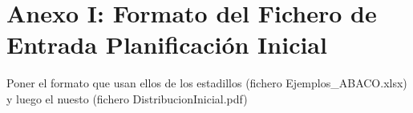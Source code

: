 
\section{Anexo I: Formato del Fichero de Entrada Planificación Inicial} \label{Anexo:A}

Poner el formato que usan ellos de los estadillos (fichero Ejemplos\_ABACO.xlsx) y luego el nuesto (fichero DistribucionInicial.pdf)
 